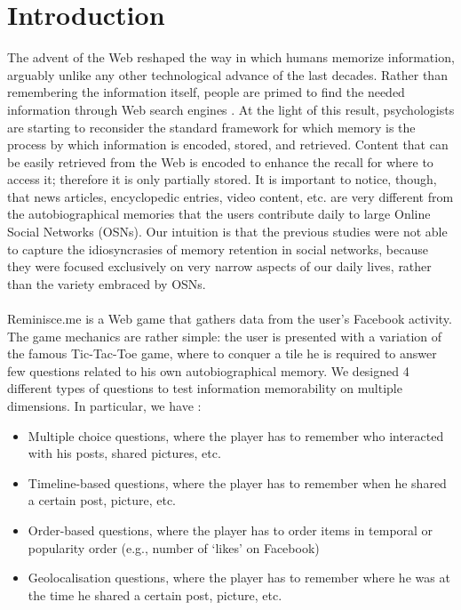 \chapter*{Introduction}
The advent of the Web reshaped the way in which humans memorize information, arguably unlike any other technological advance of the last decades. Rather than remembering the information itself, people are primed to find the needed information through Web search engines \cite{googlemem} . At the light of this result, psychologists are starting to reconsider the standard framework for which memory is the process by which information is encoded, stored, and retrieved. Content that can be easily retrieved from the Web is encoded to enhance the recall for where to access it; therefore it is only partially stored. It is important to notice, though, that news articles, encyclopedic entries, video content, etc. are very different from the autobiographical memories that the users contribute daily to large Online Social Networks (OSNs). Our intuition is that the previous studies \cite{retenauto} \cite{howhappy} were not able to capture the idiosyncrasies of memory retention in social networks, because they were focused exclusively on very narrow aspects of our daily lives, rather than the variety embraced by OSNs.\\\\
Reminisce.me is a Web game that gathers data from the user’s Facebook activity. The game mechanics are rather simple: the user is presented with a variation of the famous Tic-Tac-Toe game, where to conquer a tile he is required to answer few questions related to his own autobiographical memory. We designed 4 different types of questions to test information memorability on multiple
dimensions. In particular, we have :
\begin{itemize}
	\item Multiple choice questions, where the player has to remember who interacted with his posts, shared pictures, etc.
	\item Timeline-based questions, where the player has to remember when he shared a certain post, picture, etc.
	\item Order-based questions, where the player has to order items in temporal or popularity order (e.g., number of `likes' on Facebook)
	\item Geolocalisation questions, where the player has to remember where he was at the time he shared a certain post, picture, etc.
\end{itemize}
